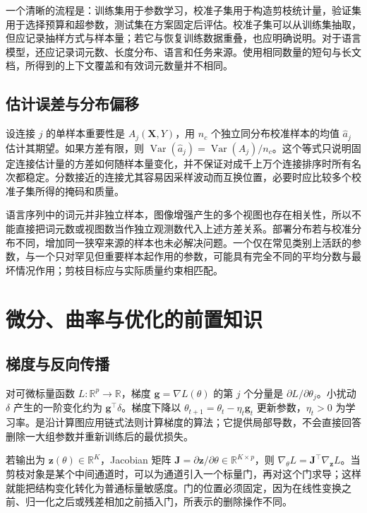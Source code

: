 \documentclass[UTF8,12pt,a4paper,fontset=fandol]{ctexart}
\begin{document}
一个清晰的流程是：训练集用于参数学习，校准子集用于构造剪枝统计量，验证集用于选择预算和超参数，测试集在方案固定后评估。校准子集可以从训练集抽取，但应记录抽样方式与样本量；若它与恢复训练数据重叠，也应明确说明。对于语言模型，还应记录词元数、长度分布、语言和任务来源。使用相同数量的短句与长文档，所得到的上下文覆盖和有效词元数量并不相同。

\subsection{估计误差与分布偏移}
设连接 $j$ 的单样本重要性是 $A_j(\mathbf X,Y)$，用 $n_c$ 个独立同分布校准样本的均值 $\widehat a_j$ 估计其期望。如果方差有限，则 $\operatorname{Var}(\widehat a_j)=\operatorname{Var}(A_j)/n_c$。这个等式只说明固定连接估计量的方差如何随样本量变化，并不保证对成千上万个连接排序时所有名次都稳定。分数接近的连接尤其容易因采样波动而互换位置，必要时应比较多个校准子集所得的掩码和质量。

语言序列中的词元并非独立样本，图像增强产生的多个视图也存在相关性，所以不能直接把词元数或视图数当作独立观测数代入上述方差关系。部署分布若与校准分布不同，增加同一狭窄来源的样本也未必解决问题。一个仅在常见类别上活跃的参数，与一个只对罕见但重要样本起作用的参数，可能具有完全不同的平均分数与最坏情况作用；剪枝目标应与实际质量约束相匹配。

\section{微分、曲率与优化的前置知识}
\label{sec:prune-calculus}

\subsection{梯度与反向传播}
对可微标量函数 $L:\mathbb R^p\to\mathbb R$，梯度 $\mathbf g=\nabla L(\theta)$ 的第 $j$ 个分量是 $\partial L/\partial\theta_j$。小扰动 $\delta$ 产生的一阶变化约为 $\mathbf g^\top\delta$。梯度下降以 $\theta_{t+1}=\theta_t-\eta_t\mathbf g_t$ 更新参数，$\eta_t>0$ 为学习率。是沿计算图应用链式法则计算梯度的算法；它提供局部导数，不会直接回答删除一大组参数并重新训练后的最优损失。

若输出为 $\mathbf z(\theta)\in\mathbb R^K$，Jacobian 矩阵 $\mathbf J=\partial\mathbf z/\partial\theta\in\mathbb R^{K\times p}$，则 $\nabla_\theta L=\mathbf J^\top\nabla_{\mathbf z}L$。当剪枝对象是某个中间通道时，可以为通道引入一个标量门，再对这个门求导；这样就能把结构变化转化为普通标量敏感度。门的位置必须固定，因为在线性变换之前、归一化之后或残差相加之前插入门，所表示的删除操作不同。
\end{document}
